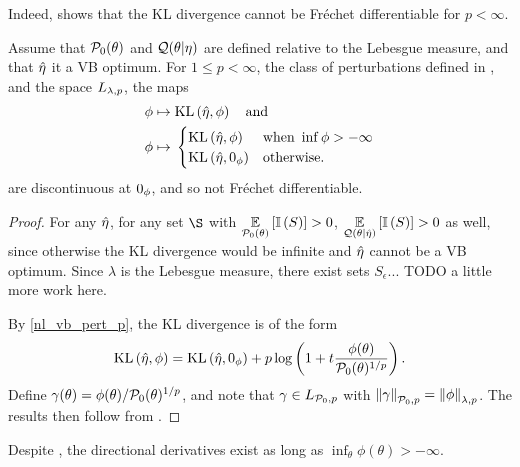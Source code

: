 Indeed,  shows that the KL divergence
cannot be Fr{\'e}chet differentiable for $p < \infty$.

%
\begin{cor}
%
Assume that $\mathcal{P}_{0}(\theta)$ and $\mathcal{Q}(\theta \vert \eta)$ are defined relative to
the Lebesgue measure, and that $\hat\eta$ it a VB optimum.  For $1 \le p <
\infty$, the class of perturbations defined in , and the
space ${L_{\lambda, p}}$, the maps
%
\begin{align*}
%
\phi \mapsto{}& \KL{\etaopt, \phi} \mathand \\
\phi \mapsto{}&
\begin{cases}
    \KL{\etaopt, \phi} & \textrm{when }\inf \phi > -\infty \\
    \KL{\etaopt, \phiz} & \textrm{otherwise}.
\end{cases}
%
\end{align*}
%
are discontinuous at $0_\phi$, and so not Fr{\'e}chet differentiable.
%
\begin{proof}
%
For any $\hat\eta$, for any set $\S$ with $\underset{\mathcal{P}_{0}(\theta)}{\mathbb{E}}\left[\mathbb{I}\left(S\right)\right] > 0$,
$\underset{\mathcal{Q}(\theta \vert \hat\eta)}{\mathbb{E}}\left[\mathbb{I}\left(S\right)\right] > 0$ as well, since otherwise
the KL divergence would be infinite and $\hat\eta$ cannot be a VB optimum.
Since $\lambda$ is the Lebesgue measure, there exist sets $S_\epsilon$...
TODO a little more work here.

By \eqref{nl_vb_pert_p}, the KL divergence is of the form
%
\begin{align*}
%
\KL{\etaopt, \phi} = \KL{\etaopt, \phiz} +
    p \log\left(1 + \t \frac{\phi(\theta)}{\pbase(\theta)^{1/p}}\right).
%
\end{align*}
%
Define $\gamma(\theta) = \phi(\theta) / \mathcal{P}_{0}(\theta)^{1/p}$, and note that
$\gamma \in {L_{\mathcal{P}_{0}, p}}$ with $\left\Vert\gamma\right\Vert_{\mathcal{P}_{0}, p} =
\left\Vert\phi\right\Vert_{\lambda, p}$.  The results then follow from
.
%
\end{proof}
%
\end{cor}


Despite , the directional derivatives exist
as long as $\inf_\theta \phi(\theta) > -\infty$.

